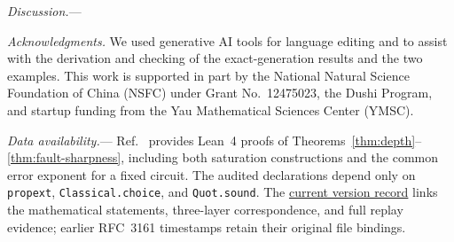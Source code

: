 \documentclass[aps,prl,reprint,notitlepage,nofootinbib,nobibnotes]{revtex4-2}
\begin{document}
\textit{Discussion.}---

\textit{Acknowledgments.} We used generative AI tools for language editing and to assist with the
derivation and checking of the exact-generation results and the two examples. This work is
supported in part by the National Natural Science Foundation of China (NSFC) under Grant
No.~12475023, the Dushi Program, and startup funding from the Yau Mathematical Sciences Center
(YMSC).

\textit{Data availability.}---
Ref.~\cite{LeanRepo} provides Lean~4 proofs of Theorems~\ref{thm:depth}--\ref{thm:fault-sharpness},
including both saturation constructions and the common error exponent for a fixed circuit.
The audited declarations depend only on \texttt{propext}, \texttt{Classical.choice},
and \texttt{Quot.sound}. The
\href{https://github.com/Imine20/critical-depth-for-the-infinite-logical-set/blob/main/CURRENT_VERSION.json}{current version record}
links the mathematical statements, three-layer correspondence, and full replay evidence; earlier RFC~3161 timestamps retain their original file bindings.
\end{document}
